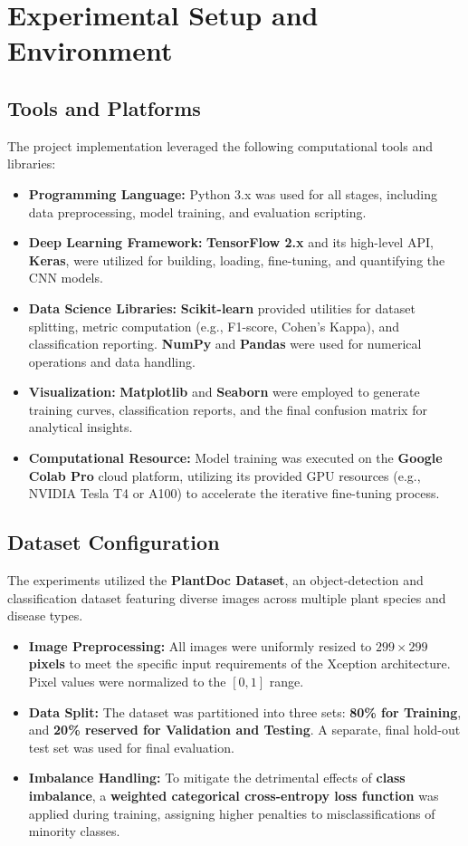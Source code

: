 \documentclass[12pt, a4paper]{report}
\begin{document}
\section{Experimental Setup and Environment}
\label{sec:setup}

\subsection*{Tools and Platforms} %
\noindent
The project implementation leveraged the following computational tools and libraries:
\begin{itemize}
    \item \textbf{Programming Language:} Python 3.x was used for all stages, including data preprocessing, model training, and evaluation scripting.
    \item \textbf{Deep Learning Framework:} \textbf{TensorFlow 2.x} and its high-level API, \textbf{Keras}, were utilized for building, loading, fine-tuning, and quantifying the CNN models.
    \item \textbf{Data Science Libraries:} \textbf{Scikit-learn} provided utilities for dataset splitting, metric computation (e.g., F1-score, Cohen's Kappa), and classification reporting. \textbf{NumPy} and \textbf{Pandas} were used for numerical operations and data handling.
    \item \textbf{Visualization:} \textbf{Matplotlib} and \textbf{Seaborn} were employed to generate training curves, classification reports, and the final confusion matrix for analytical insights.
    \item \textbf{Computational Resource:} Model training was executed on the \textbf{Google Colab Pro} cloud platform, utilizing its provided GPU resources (e.g., NVIDIA Tesla T4 or A100) to accelerate the iterative fine-tuning process.
\end{itemize}

\subsection*{Dataset Configuration} %
\noindent
The experiments utilized the \textbf{PlantDoc Dataset}, an object-detection and classification dataset featuring diverse images across multiple plant species and disease types.
\begin{itemize}
    \item \textbf{Image Preprocessing:} All images were uniformly resized to \textbf{$299 \times 299$ pixels} to meet the specific input requirements of the Xception architecture. Pixel values were normalized to the $[0, 1]$ range.
    \item \textbf{Data Split:} The dataset was partitioned into three sets: \textbf{80\% for Training}, and \textbf{20\% reserved for Validation and Testing}. A separate, final hold-out test set was used for final evaluation.
    \item \textbf{Imbalance Handling:} To mitigate the detrimental effects of \textbf{class imbalance}, a \textbf{weighted categorical cross-entropy loss function} was applied during training, assigning higher penalties to misclassifications of minority classes.
\end{itemize}
\end{document}
